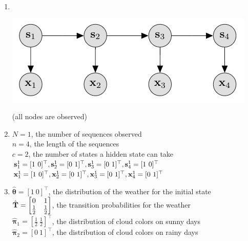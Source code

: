 \documentclass[12pt]{article}
\begin{document}
\begin{solution}
\begin{enumerate}
	\item \
	\begin{center}
		\includegraphics{hmm_p2}
	\end{center}
	(all nodes are observed)
	
	\item $N=1$, the number of sequences observed\\
	$n=4$, the length of the sequences\\
	$c=2$, the number of states a hidden state can take\\
	$\bolds^1_1 = [1 \ 0]^\top, \bolds^1_2 = [0 \ 1]^\top, \bolds^1_3 = [0 \ 1]^\top, \bolds^1_4 = [1 \ 0]^\top$\\
	$\boldx^1_1 = [1 \ 0]^\top, \boldx^1_2 = [0 \ 1]^\top, \boldx^1_3 = [0 \ 1]^\top, \boldx^1_4 = [0 \ 1]^\top$
	\item $\hat{\boldsymbol{\theta}} = [1 \ 0]^\top$, the distribution of the weather for the initial state\\
	$\hat{\mathbf{T}} = \begin{bmatrix} 0 & 1 \\ \frac{1}{2} & \frac{1}{2} \end{bmatrix}$, the transition probabilities for the weather\\
	$\hat{\boldsymbol{\pi}}_1 = [\frac{1}{2} \ \frac{1}{2}]^\top$, the distribution of cloud colors on sunny days\\
	$\hat{\boldsymbol{\pi}}_2 = [0 \ 1]^\top$, the distribution of cloud colors on rainy days
\end{enumerate}
\end{solution}
\end{document}
